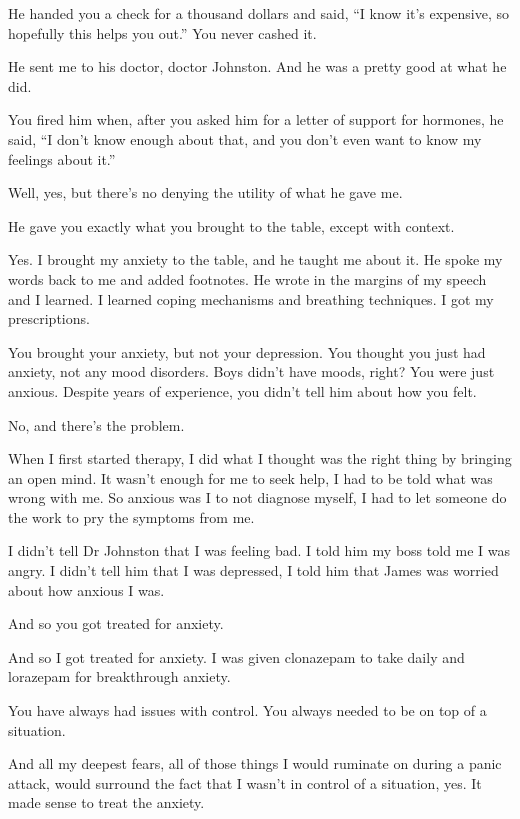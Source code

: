 \begin{paracol}{2}
\begin{leftcolumn}
\begin{ally}
He handed you a check for a thousand dollars and said, ``I know it's expensive, so hopefully this helps you out.'' You never cashed it.
\end{ally}
He sent me to his doctor, doctor Johnston. And he was a pretty good at what he did.

\begin{ally}
You fired him when, after you asked him for a letter of support for hormones, he said, ``I don't know enough about that, and you don't even want to know my feelings about it.''
\end{ally}
Well, yes, but there's no denying the utility of what he gave me.

\begin{ally}
He gave you exactly what you brought to the table, except with context.
\end{ally}
Yes. I brought my anxiety to the table, and he taught me about it. He spoke my words back to me and added footnotes. He wrote in the margins of my speech and I learned. I learned coping mechanisms and breathing techniques. I got my prescriptions.

\begin{ally}
You brought your anxiety, but not your depression. You thought you just had anxiety, not any mood disorders. Boys didn't have moods, right? You were just anxious. Despite years of experience, you didn't tell him about how you felt.
\end{ally}
No, and there's the problem.
\newpage

\noindent When I first started therapy, I did what I thought was the right thing by bringing an open mind. It wasn't enough for me to seek help, I had to be told what was wrong with me. So anxious was I to not diagnose myself, I had to let someone do the work to pry the symptoms from me.

I didn't tell Dr Johnston that I was feeling bad. I told him my boss told me I was angry. I didn't tell him that I was depressed, I told him that James was worried about how anxious I was.

\begin{ally}
And so you got treated for anxiety.
\end{ally}
And so I got treated for anxiety. I was given clonazepam to take daily and lorazepam for breakthrough anxiety.

\begin{ally}
You have always had issues with control. You always needed to be on top of a situation.
\end{ally}
And all my deepest fears, all of those things I would ruminate on during a panic attack, would surround the fact that I wasn't in control of a situation, yes. It made sense to treat the anxiety.


\end{leftcolumn}
\end{paracol}

